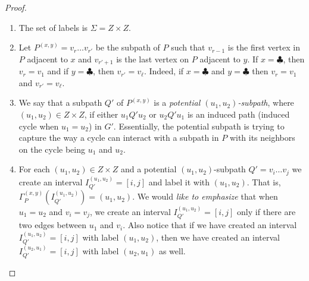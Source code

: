 \begin{proof}
\begin{enumerate}
\setlength{\itemsep}{-2pt}
\item The set of labels is $\Sigma=Z \times Z$. 
\item Let $P^{(x,y)}= v_r\ldots v_{r'}$ be the subpath of $P$ such that $v_{r-1}$ is the first vertex in $P$ adjacent to $x$ and $v_{r'+1}$ is the last vertex on $P$ adjacent to $y$.  If $x=\clubsuit$, then $v_r=v_1$ and if $y=\clubsuit$, then $v_{r'}=v_\ell$. Indeed, if $x=\clubsuit$ and $y=\clubsuit$ then $v_r=v_1$ and $v_{r'}=v_\ell$. 
\item We say that a subpath $Q'$ of $P^{(x,y)}$ is a {\em potential $(u_1,u_2)$-subpath}, 
where $(u_1,u_2)\in Z \times Z$, if   
either $u_1Q'u_2$ or $u_2Q'u_1$ is an induced path (induced cycle when $u_1=u_2$) in $G'$. Essentially, the potential subpath is trying to capture the way a cycle can interact with a subpath in $P$ with its neighbors on the cycle being $u_1$ and $u_2$.
\item For each $(u_1,u_2)\in Z \times Z$ 
and a potential $(u_1,u_2)$-subpath $Q'=v_i\ldots v_j$ we create an interval  
$I_{Q'}^{(u_1,u_2)}=[i,j]$ and  label it with $(u_1,u_2)$. That is, $\Gamma_P^{(x,y)}(I_{Q'}^{(u_1,u_2)})=(u_1,u_2)$. 
We would {\em like to emphasize} that when $u_1=u_2$ and $v_i=v_j$, we create an interval $I_{Q'}^{(u_1,u_2)}=[i,j]$ only if 
there are two edges between $u_1$ and $v_i$.  
Also notice that if we have created an interval $I_{Q'}^{(u_1,u_2)}=[i,j]$ with label $(u_1,u_2)$, then we have created an interval $I_{Q'}^{(u_2,u_1)}=[i,j]$ with label $(u_2,u_1)$ as well.  
\end{enumerate}

\begin{figure}

\centering

\end{figure}
\end{proof}
